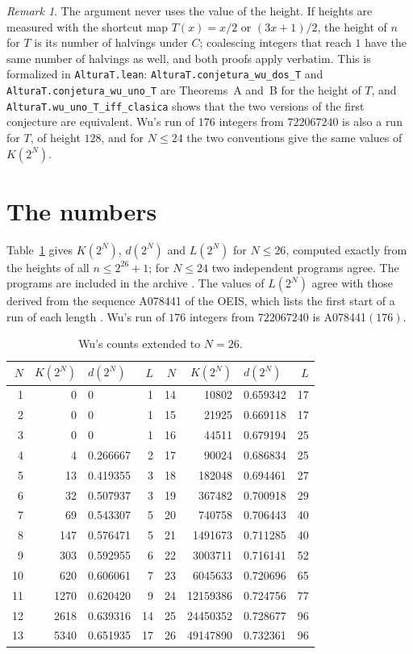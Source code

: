 \documentclass[11pt]{amsart}
\theoremstyle{definition}
\theoremstyle{remark}
\newtheorem{remark}[theorem]{Remark}
\newcommand{\lean}[1]{\nolinkurl{#1}}
\begin{document}
\begin{remark}\label{rem:T}
The argument never uses the value of the height. If heights are measured with the shortcut map $T(x)=x/2$ or $(3x+1)/2$, the height of $n$ for $T$ is its number of halvings under $C$; coalescing integers that reach $1$ have the same number of halvings as well, and both proofs apply verbatim. This is formalized in \lean{AlturaT.lean}: \lean{AlturaT.conjetura_wu_dos_T} and \lean{AlturaT.conjetura_wu_uno_T} are Theorems~A and~B for the height of $T$, and \lean{AlturaT.wu_uno_T_iff_clasica} shows that the two versions of the first conjecture are equivalent. Wu's run of $176$ integers from $722067240$ is also a run for $T$, of height $128$, and for $N\le 24$ the two conventions give the same values of $K(2^N)$.
\end{remark}

\section{The numbers}\label{sec:table}

Table~\ref{tab:wu} gives $K(2^N)$, $d(2^N)$ and $L(2^N)$ for $N\le 26$, computed exactly from the heights of all $n\le 2^{26}+1$; for $N\le 24$ two independent programs agree. The programs are included in the archive \cite{Artifact}. The values of $L(2^N)$ agree with those derived from the sequence A078441 of the OEIS, which lists the first start of a run of each length \cite{OEIS}. Wu's run of $176$ integers from $722067240$ is A078441$(176)$.

\begin{table}[ht]
\caption{Wu's counts extended to $N=26$.}\label{tab:wu}
\small
\begin{tabular}{@{}rrlr@{\qquad}rrlr@{}}
\toprule
$N$ & $K(2^N)$ & $d(2^N)$ & $L$ & $N$ & $K(2^N)$ & $d(2^N)$ & $L$ \\
\midrule
1 & 0 & 0 & 1 & 14 & 10802 & 0.659342 & 17 \\
2 & 0 & 0 & 1 & 15 & 21925 & 0.669118 & 17 \\
3 & 0 & 0 & 1 & 16 & 44511 & 0.679194 & 25 \\
4 & 4 & 0.266667 & 2 & 17 & 90024 & 0.686834 & 25 \\
5 & 13 & 0.419355 & 3 & 18 & 182048 & 0.694461 & 27 \\
6 & 32 & 0.507937 & 3 & 19 & 367482 & 0.700918 & 29 \\
7 & 69 & 0.543307 & 5 & 20 & 740758 & 0.706443 & 40 \\
8 & 147 & 0.576471 & 5 & 21 & 1491673 & 0.711285 & 40 \\
9 & 303 & 0.592955 & 6 & 22 & 3003711 & 0.716141 & 52 \\
10 & 620 & 0.606061 & 7 & 23 & 6045633 & 0.720696 & 65 \\
11 & 1270 & 0.620420 & 9 & 24 & 12159386 & 0.724756 & 77 \\
12 & 2618 & 0.639316 & 14 & 25 & 24450352 & 0.728677 & 96 \\
13 & 5340 & 0.651935 & 17 & 26 & 49147890 & 0.732361 & 96 \\
\bottomrule
\end{tabular}
\end{table}
\end{document}
